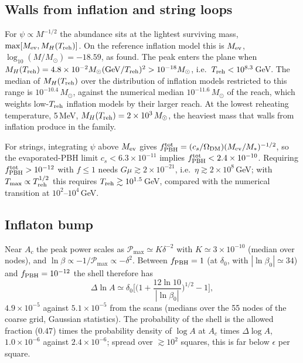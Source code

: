\documentclass[aps,prd,onecolumn,superscriptaddress,nofootinbib,floatfix]{revtex4-2}
\newcommand{\fpbh}{f_{\rm PBH}}
\newcommand{\Msun}{M_\odot}
\newcommand{\Treh}{T_{\rm reh}}
\begin{document}
\subsection{Walls from inflation and string loops}

For $\psi\propto M^{-1/2}$ the abundance sits at the lightest surviving mass, $\max[M_{\rm ev},M_H(\Treh)]$. On the reference inflation model this is $M_{\rm ev}$, $\log_{10}(M/\Msun)=-18.59$, as found. The peak enters the plane when $M_H(\Treh)=4.8\times10^{-2}\Msun({\rm GeV}/\Treh)^2>10^{-18}\Msun$, i.e.\ $\Treh<10^{8.3}$\,GeV. The median of $M_H(\Treh)$ over the distribution of inflation models restricted to this range is $10^{-10.4}\,\Msun$, against the numerical median $10^{-11.6}\,\Msun$ of the reach, which weights low-$\Treh$ inflation models by their larger reach. At the lowest reheating temperature, 5\,MeV, $M_H(\Treh)=2\times10^{3}\,\Msun$, the heaviest mass that walls from inflation produce in the family.

For strings, integrating $\psi$ above $M_{\rm ev}$ gives $\fpbh^{\rm tot}=(c_s/\Omega_{\rm DM})(M_{\rm ev}/M_\ast)^{-1/2}$, so the evaporated-PBH limit $c_s<6.3\times10^{-11}$ implies $\fpbh^{\rm tot}<2.4\times10^{-10}$. Requiring $\fpbh^{\rm tot}>10^{-12}$ with $f\le1$ needs $G\mu\gtrsim2\times10^{-21}$, i.e.\ $\eta\gtrsim2\times10^{8}$\,GeV; with $T_{\max}\propto\Treh^{1/2}$ this requires $\Treh\gtrsim10^{1.5}$\,GeV, compared with the numerical transition at $10^{2}$--$10^{4}$\,GeV.

\subsection{Inflaton bump}

Near $A_c$ the peak power scales as $\mathcal{P}_{\max}\simeq K\delta^{-2}$ with $K\simeq3\times10^{-10}$ (median over nodes), and $\ln\beta\propto-1/\mathcal{P}_{\max}\propto-\delta^2$. Between $\fpbh=1$ (at $\delta_0$, with $|\ln\beta_0|\simeq34$) and $\fpbh=10^{-12}$ the shell therefore has
\begin{equation}
\Delta\ln A\simeq\delta_0\Big[\Big(1+\frac{12\ln10}{|\ln\beta_0|}\Big)^{1/2}-1\Big],
\end{equation}
$4.9\times10^{-5}$ against $5.1\times10^{-5}$ from the scans (medians over the 55 nodes of the coarse grid, Gaussian statistics). The probability of the shell is the allowed fraction ($0.47$) times the probability density of $\log A$ at $A_c$ times $\Delta\log A$, $1.0\times10^{-6}$ against $2.4\times10^{-6}$; spread over $\gtrsim10^2$ squares, this is far below $\epsilon$ per square.
\end{document}
